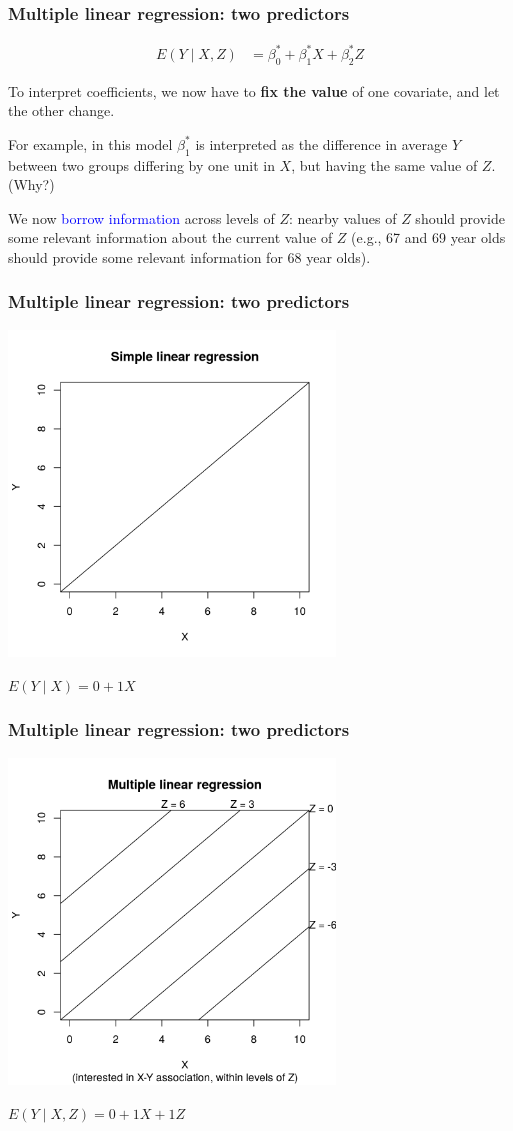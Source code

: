 \documentclass[12pt, 
hyperref={colorlinks=true, linkcolor=blue, urlcolor=cyan}]{beamer}
\begin{document}
\begin{frame}
\frametitle{Multiple linear regression: two predictors}
\begin{align*}
E(Y \mid X, Z) &= \beta_0^* + \beta_1^* X + \beta_2^* Z
\end{align*}

To interpret coefficients, we now have to \textbf{fix the value} of one covariate, and let the other change.

For example, in this model $\beta_1^*$ is interpreted as the difference in average $Y$ between two groups differing by one unit in $X$, but having the same value of $Z$. (Why?)

We now \textcolor{blue}{borrow information} across levels of $Z$: nearby values of $Z$ should provide some relevant information about the current value of $Z$ (e.g., 67 and 69 year olds should provide some relevant information for 68 year olds).

\end{frame}

\begin{frame}
\frametitle{Multiple linear regression: two predictors}
\centering
\includegraphics[width = 0.65\textwidth]{plots/simple_line.png}

$E(Y \mid X) = 0 + 1 X$
\end{frame}

\begin{frame}
\frametitle{Multiple linear regression: two predictors}
\centering
\includegraphics[width = 0.65\textwidth]{plots/multiple_line.png}

$E(Y \mid X, Z) = 0 + 1 X + 1 Z$
\end{frame}
\end{document}
